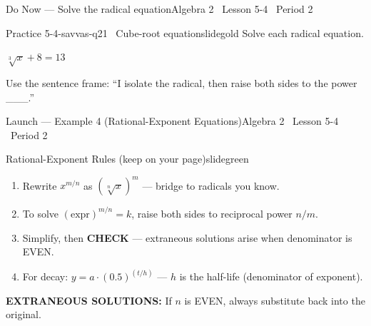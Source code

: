 \documentclass[aspectratio=169, 11pt]{beamer}
\begin{document}

\begin{frame}{Do Now --- Solve the radical equation}{Algebra 2 \textperiodcentered\ Lesson 5-4 \textperiodcentered\ Period 2}
\vspace{0.2cm}
\begin{projcard}{Practice 5-4-savvas-q21 \textperiodcentered\ Cube-root equation}{slidegold}
Solve each radical equation.

\vspace{0.25cm}
\(\sqrt[3]{x} + 8 = 13\)

\vspace{0.25cm}
Use the sentence frame:\quad
``I isolate the radical, then raise both sides to the power \_\_\_.''
\end{projcard}
\end{frame}

\begin{frame}{Launch --- Example 4 (Rational-Exponent Equations)}{Algebra 2 \textperiodcentered\ Lesson 5-4 \textperiodcentered\ Period 2}
\vspace{0.2cm}
\begin{projcard}{Rational-Exponent Rules (keep on your page)}{slidegreen}
\begin{enumerate}
  \setlength{\itemsep}{0pt}
  \item Rewrite \(x^{m/n}\) as \((\sqrt[n]{x})^m\) --- bridge to radicals you know.
  \item To solve \((\text{expr})^{m/n} = k\), raise both sides to reciprocal power \(n/m\).
  \item Simplify, then \textbf{CHECK} --- extraneous solutions arise when denominator is EVEN.
  \item For decay: \(y = a \cdot (0.5)^{(t/h)}\) --- \(h\) is the half-life (denominator of exponent).
\end{enumerate}

\vspace{0.1cm}
\small
\textcolor{slideaccent}{\textbf{EXTRANEOUS SOLUTIONS:}} If \(n\) is EVEN, always substitute back into the original.
\end{projcard}
\end{frame}
\end{document}
